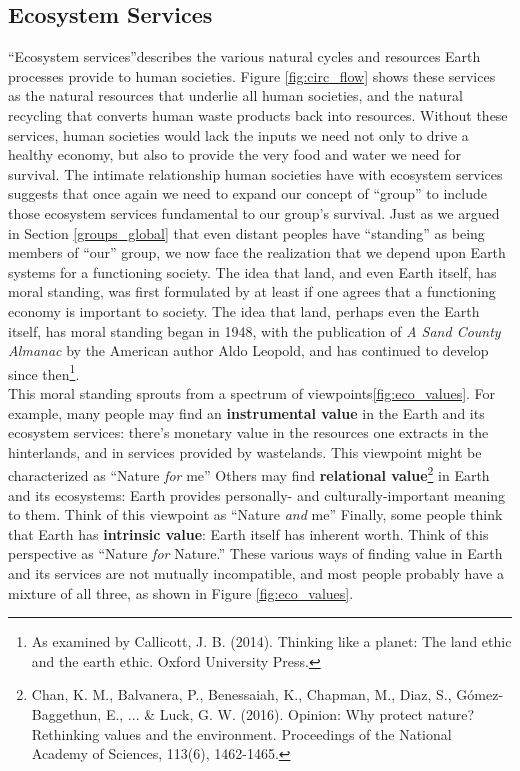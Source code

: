 \subsection{Ecosystem Services}\label{eco_servs}
``Ecosystem services''describes the various natural cycles and resources Earth processes provide to human societies. Figure \ref{fig:circ_flow} shows these services as the natural resources that underlie all human societies, and the natural recycling that converts human waste products back into resources. Without these services, human societies would lack the inputs we need not only to drive a healthy economy, but also to provide the very food and water we need for survival. The intimate relationship human societies have with ecosystem services suggests that once again we need to expand our concept of ``group'' to include those ecosystem services fundamental to our group's survival. Just as we argued in Section \ref{groups_global} that even distant peoples have ``standing'' as being members of ``our'' group, we now face the realization that we depend upon Earth systems for a functioning society. The idea that land, and even Earth itself, has moral standing, was first formulated by at least if one agrees that a functioning economy is important to society. The idea that land, perhaps even the Earth itself, has moral standing began in 1948, with the publication of \textit{A Sand County Almanac} by the American author Aldo Leopold, and has continued to develop since then\footnote{As examined by Callicott, J. B. (2014). Thinking like a planet: The land ethic and the earth ethic. Oxford University Press.}.\\

This moral standing sprouts from a spectrum of viewpoints\ref{fig:eco_values}. For example, many people may find an \textbf{instrumental value} in the Earth and its ecosystem services: there's monetary value in the resources one extracts in the hinterlands, and in services provided by wastelands. This viewpoint might be characterized as ``Nature \emph{for} me'' Others may find \textbf{relational value}\footnote{Chan, K. M., Balvanera, P., Benessaiah, K., Chapman, M., Diaz, S., G\'omez-Baggethun, E., ... \& Luck, G. W. (2016). Opinion: Why protect nature? Rethinking values and the environment. Proceedings of the National Academy of Sciences, 113(6), 1462-1465.} in Earth and its ecosystems: Earth provides personally- and culturally-important meaning to them. Think of this viewpoint as ``Nature \emph{and} me'' Finally, some people think that Earth has \textbf{intrinsic value}: Earth itself has inherent worth. Think of this perspective as ``Nature \emph{for} Nature.'' These various ways of finding value in Earth and its services are not mutually incompatible, and most people probably have a mixture of all three, as shown in Figure \ref{fig:eco_values}.\\
 
